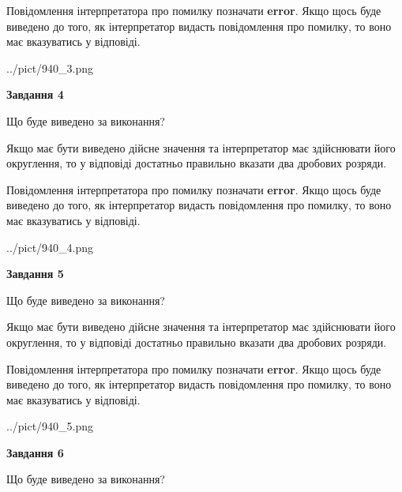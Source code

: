 \documentclass[12pt, ukrainian]{article}
\begin{document}
{\begin {Large}
Повідомлення інтерпретатора про помилку позначати \textbf{error}.
Якщо щось буде виведено до того, як інтерпретатор видасть повідомлення про помилку, 
то воно має вказуватись у відповіді. \par

\begin{center}
	{../pict/940_3.png}
\end{center}
\newpage

{\begin {center}\textbf{Завдання 4}\end {center}}\par
Що буде виведено за виконання? \par

Якщо має бути виведено дійсне значення та інтерпретатор має здійснювати його округлення, 
то у відповіді достатньо правильно вказати два дробових розряди.

Повідомлення інтерпретатора про помилку позначати \textbf{error}.
Якщо щось буде виведено до того, як інтерпретатор видасть повідомлення про помилку, 
то воно має вказуватись у відповіді. \par

\begin{center}
	{../pict/940_4.png}
\end{center}
\newpage

{\begin {center}\textbf{Завдання 5}\end {center}}\par
Що буде виведено за виконання? \par

Якщо має бути виведено дійсне значення та інтерпретатор має здійснювати його округлення, 
то у відповіді достатньо правильно вказати два дробових розряди.

Повідомлення інтерпретатора про помилку позначати \textbf{error}.
Якщо щось буде виведено до того, як інтерпретатор видасть повідомлення про помилку, 
то воно має вказуватись у відповіді. \par

\begin{center}
	{../pict/940_5.png}
\end{center}
\newpage

{\begin {center}\textbf{Завдання 6}\end {center}}\par
Що буде виведено за виконання? \par


\end{Large}}
\end{document}
